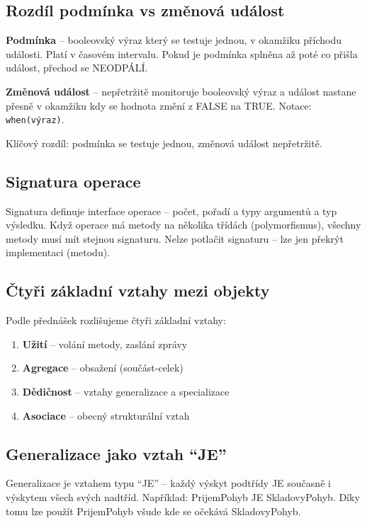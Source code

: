 \documentclass[12pt, a4paper]{article}
\begin{document}
\subsection{Rozdíl podmínka vs změnová událost}

\textbf{Podmínka} -- booleovský výraz který se testuje jednou, v okamžiku příchodu události. Platí v časovém intervalu. Pokud je podmínka splněna až poté co přišla událost, přechod se NEODPÁLÍ.

\textbf{Změnová událost} -- nepřetržitě monitoruje booleovský výraz a událost nastane přesně v okamžiku kdy se hodnota změní z FALSE na TRUE. Notace: \texttt{when(výraz)}.

Klíčový rozdíl: podmínka se testuje jednou, změnová událost nepřetržitě.

\subsection{Signatura operace}

Signatura definuje interface operace -- počet, pořadí a typy argumentů a typ výsledku. Když operace má metody na několika třídách (polymorfismus), všechny metody musí mít stejnou signaturu. Nelze potlačit signaturu -- lze jen překrýt implementaci (metodu).

\subsection{Čtyři základní vztahy mezi objekty}

Podle přednášek rozlišujeme čtyři základní vztahy:
\begin{enumerate}
  \item \textbf{Užití} -- volání metody, zaslání zprávy
  \item \textbf{Agregace} -- obsažení (součást-celek)
  \item \textbf{Dědičnost} -- vztahy generalizace a specializace
  \item \textbf{Asociace} -- obecný strukturální vztah
\end{enumerate}

\subsection{Generalizace jako vztah ``JE''}

Generalizace je vztahem typu ``JE'' -- každý výskyt podtřídy JE současně i výskytem všech svých nadtříd. Například: PrijemPohyb JE SkladovyPohyb. Díky tomu lze použít PrijemPohyb všude kde se očekává SkladovyPohyb.
\end{document}
